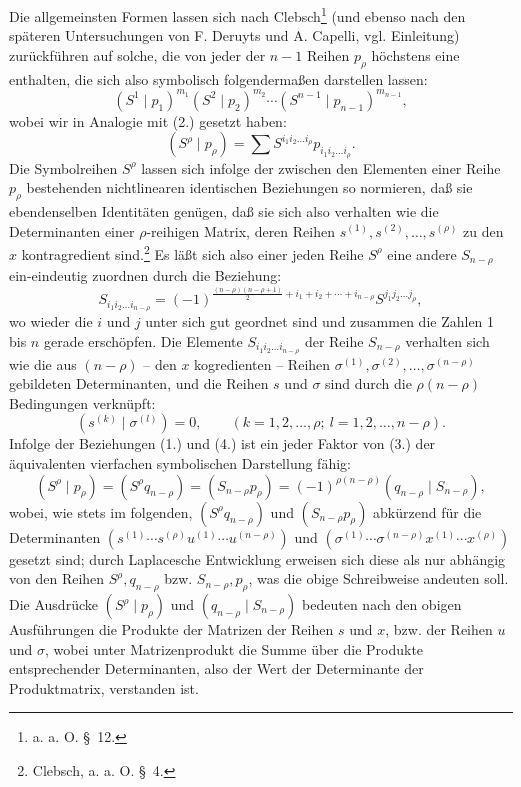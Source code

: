 \documentclass[11pt]{article}
\begin{document}
Die allgemeinsten Formen lassen sich nach Clebsch\footnote{a. a. O. \S\ 12.} (und ebenso nach den späteren Untersuchungen von F. Deruyts und A. Capelli, vgl. Einleitung) zurückführen auf solche, die von jeder der $n-1$ Reihen $p_\rho$ höchstens eine enthalten, die sich also symbolisch folgendermaßen darstellen lassen:
\begin{equation}
 (S^1\mid p_1)^{m_1}(S^2\mid p_2)^{m_2}\cdots(S^{n-1}\mid p_{n-1})^{m_{n-1}},
\tag{3}
\end{equation}
wobei wir in Analogie mit (2.) gesetzt haben:
\[
 (S^\rho\mid p_\rho)=\sum S^{i_1i_2\ldots i_\rho}p_{i_1i_2\ldots i_\rho}.
\]
Die Symbolreihen $S^\rho$ lassen sich infolge der zwischen den Elementen einer Reihe $p_\rho$ bestehenden nichtlinearen identischen Beziehungen so normieren, daß sie ebendenselben Identitäten genügen, daß sie sich also verhalten wie die Determinanten einer $\rho$-reihigen Matrix, deren Reihen $s^{(1)},s^{(2)},\ldots,s^{(\rho)}$ zu den $x$ kontragredient sind.\footnote{Clebsch, a. a. O. \S\ 4.} Es läßt sich also einer jeden Reihe $S^\rho$ eine andere $S_{n-\rho}$ ein-eindeutig zuordnen durch die Beziehung:
\begin{equation}
 S_{i_1i_2\ldots i_{n-\rho}}=(-1)^{\frac{(n-\rho)(n-\rho+1)}2+i_1+i_2+\cdots+i_{n-\rho}}S^{j_1j_2\ldots j_\rho},
\tag{4}
\end{equation}
wo wieder die $i$ und $j$ unter sich gut geordnet sind und zusammen die Zahlen 1 bis $n$ gerade erschöpfen. Die Elemente $S_{i_1i_2\ldots i_{n-\rho}}$ der Reihe $S_{n-\rho}$ verhalten sich wie die aus $(n-\rho)$ -- den $x$ kogredienten -- Reihen $\sigma^{(1)},\sigma^{(2)},\ldots,\sigma^{(n-\rho)}$ gebildeten Determinanten, und die Reihen $s$ und $\sigma$ sind durch die $\rho(n-\rho)$ Bedingungen verknüpft:
\begin{equation}
 (s^{(k)}\mid \sigma^{(l)})=0,\qquad(k=1,2,\ldots,\rho;\ l=1,2,\ldots,n-\rho).
\tag{5}
\end{equation}
Infolge der Beziehungen (1.) und (4.) ist ein jeder Faktor von (3.) der äquivalenten vierfachen symbolischen Darstellung fähig:
\begin{equation}
 (S^\rho\mid p_\rho)=(S^\rho q_{n-\rho})=(S_{n-\rho}p_\rho)=(-1)^{\rho(n-\rho)}(q_{n-\rho}\mid S_{n-\rho}),
\tag{6}
\end{equation}
wobei, wie stets im folgenden, $(S^\rho q_{n-\rho})$ und $(S_{n-\rho}p_\rho)$ abkürzend für die Determinanten $(s^{(1)}\cdots s^{(\rho)}u^{(1)}\cdots u^{(n-\rho)})$ und $(\sigma^{(1)}\cdots\sigma^{(n-\rho)}x^{(1)}\cdots x^{(\rho)})$ gesetzt sind; durch Laplacesche Entwicklung erweisen sich diese als nur abhängig von den Reihen $S^\rho,q_{n-\rho}$ bzw. $S_{n-\rho},p_\rho$, was die obige Schreibweise andeuten soll. Die Ausdrücke $(S^\rho\mid p_\rho)$ und $(q_{n-\rho}\mid S_{n-\rho})$ bedeuten nach den obigen Ausführungen die Produkte der Matrizen der Reihen $s$ und $x$, bzw. der Reihen $u$ und $\sigma$, wobei unter Matrizenprodukt die Summe über die Produkte entsprechender Determinanten, also der Wert der Determinante der Produktmatrix, verstanden ist.
\end{document}
